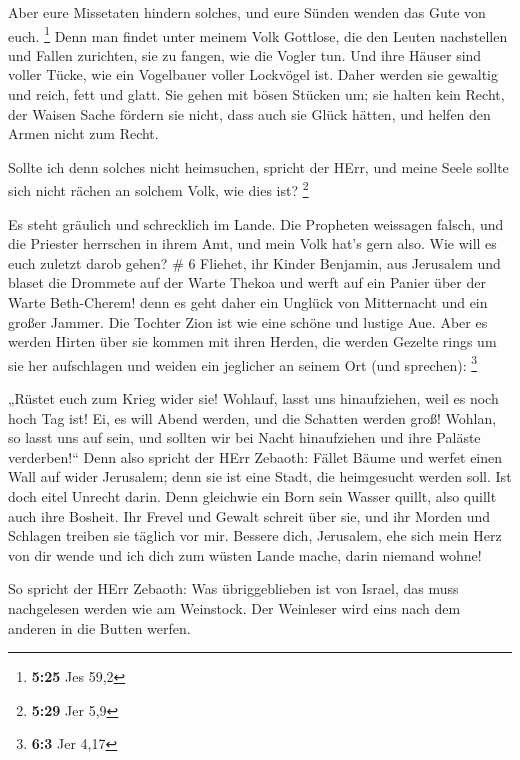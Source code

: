  Aber eure Missetaten hindern solches, und eure Sünden
wenden das Gute von euch. \footnote{\textbf{5:25} Jes 59,2}
 Denn man findet unter meinem Volk Gottlose, die den Leuten
nachstellen und Fallen zurichten, sie zu fangen, wie die Vogler tun.
 Und ihre Häuser sind voller Tücke, wie ein Vogelbauer
voller Lockvögel ist. Daher werden sie gewaltig und reich, fett und
glatt.  Sie gehen mit bösen Stücken um; sie halten kein
Recht, der Waisen Sache fördern sie nicht, dass auch sie Glück hätten,
und helfen den Armen nicht zum Recht.

 Sollte ich denn solches nicht heimsuchen, spricht der
HErr, und meine Seele sollte sich nicht rächen an solchem Volk, wie dies
ist? \footnote{\textbf{5:29} Jer 5,9}

 Es steht gräulich und schrecklich im Lande. 
Die Propheten weissagen falsch, und die Priester herrschen in ihrem Amt,
und mein Volk hat's gern also. Wie will es euch zuletzt darob gehen? \#
6  Fliehet, ihr Kinder Benjamin, aus Jerusalem und blaset
die Drommete auf der Warte Thekoa und werft auf ein Panier über der
Warte Beth-Cherem! denn es geht daher ein Unglück von Mitternacht und
ein großer Jammer.  Die Tochter Zion ist wie eine schöne und
lustige Aue.  Aber es werden Hirten über sie kommen mit
ihren Herden, die werden Gezelte rings um sie her aufschlagen und weiden
ein jeglicher an seinem Ort (und sprechen): \footnote{\textbf{6:3} Jer
  4,17}

 „Rüstet euch zum Krieg wider sie! Wohlauf, lasst uns
hinaufziehen, weil es noch hoch Tag ist! Ei, es will Abend werden, und
die Schatten werden groß!  Wohlan, so lasst uns auf sein,
und sollten wir bei Nacht hinaufziehen und ihre Paläste verderben!{}``
 Denn also spricht der HErr Zebaoth: Fället Bäume und werfet
einen Wall auf wider Jerusalem; denn sie ist eine Stadt, die heimgesucht
werden soll. Ist doch eitel Unrecht darin.  Denn gleichwie
ein Born sein Wasser quillt, also quillt auch ihre Bosheit. Ihr Frevel
und Gewalt schreit über sie, und ihr Morden und Schlagen treiben sie
täglich vor mir.  Bessere dich, Jerusalem, ehe sich mein
Herz von dir wende und ich dich zum wüsten Lande mache, darin niemand
wohne!

 So spricht der HErr Zebaoth: Was übriggeblieben ist von
Israel, das muss nachgelesen werden wie am Weinstock. Der Weinleser wird
eins nach dem anderen in die Butten werfen.

